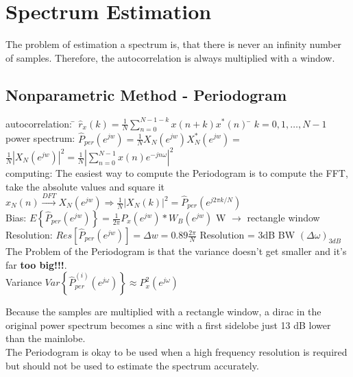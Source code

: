 \section{Spectrum Estimation}
The problem of estimation a spectrum is, that there is never an infinity number of samples. 
Therefore, the autocorrelation is always multiplied with a window.

\subsection{Nonparametric Method - Periodogram }
\begin{tabbing}
autocorrelation: 	\= $\hat{r}_x(k) =\frac{1}{N} \sum \limits_{n=0}^{N-1-k} x(n+k)x^*(n)$   \hspace{4cm} \= $k=0,1,\ldots,N-1$ \\
power spectrum:  	\>  $\hat{P}_{per}(e^{jw}) = \frac{1}{N} X_N(e^{jw})X^*_N(e^{jw}) = $\\
\>					$\frac{1}{N}  \left\lvert X_N(e^{jw}) \right\rvert ^2 =  \frac{1}{N}  \left\lvert \sum\limits_{n=0}^{N-1} x(n)e^{-jn\omega} \right\rvert ^2$   \\
computing:  		\> The easiest way to compute the Periodogram is to compute the FFT, take the absolute values and square it\\
					\> $x_N(n) \xrightarrow{DFT} X_N(e^{jw}) \Rightarrow \frac{1}{N}  \left\lvert X_N(k) \right\rvert ^2 = \hat{P}_{per}(e^{j 2 \pi k/N})$ \\
Bias: 				\>  $E\left\lbrace \hat{P}_{per}(e^{jw}) \right\rbrace = \frac{1}{2 \pi}P_x(e^{jw})*W_B(e^{jw})$ \> W $\to$ rectangle window\\
Resolution: 		\>  $Res[\hat{P}_{per}(e^{jw})] = \Delta w = 0.89 \frac{2 \pi}{N}$\> Resolution = 3dB BW $(\Delta\omega)_{3dB}$\\
The Problem of the Periodogram is that the variance doesn't get smaller and it's far \textbf{too big!!!}.\\
Variance 			\> $Var\left\lbrace \hat{P}_{per}^{(i)}(e^{j\omega}) \right\rbrace \approx P^2_x(e^{j\omega})$\\
\end{tabbing}
Because the samples are multiplied with a rectangle window, a dirac in the original power spectrum becomes a sinc with a first sidelobe just 13 dB lower than the mainlobe.\\
 
 
The Periodogram is okay to be used when a high frequency resolution is required but should
not be used to estimate the spectrum accurately. 
 
